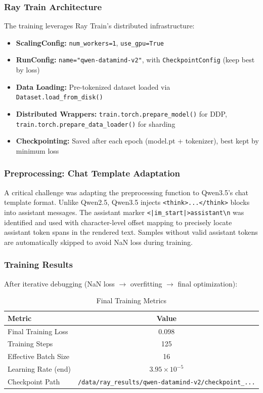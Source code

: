 \documentclass[12pt,a4paper]{article}
\begin{document}
\subsubsection{Ray Train Architecture}

The training leverages Ray Train's distributed infrastructure:

\begin{itemize}[leftmargin=*]
    \item \textbf{ScalingConfig:} \texttt{num\_workers=1}, \texttt{use\_gpu=True}
    \item \textbf{RunConfig:} \texttt{name="qwen-datamind-v2"}, with \texttt{CheckpointConfig} (keep best by loss)
    \item \textbf{Data Loading:} Pre-tokenized dataset loaded via \texttt{Dataset.load\_from\_disk()}
    \item \textbf{Distributed Wrappers:} \texttt{train.torch.prepare\_model()} for DDP, \texttt{train.torch.prepare\_data\_loader()} for sharding
    \item \textbf{Checkpointing:} Saved after each epoch (model.pt + tokenizer), best kept by minimum loss
\end{itemize}

\subsubsection{Preprocessing: Chat Template Adaptation}

A critical challenge was adapting the preprocessing function to Qwen3.5's chat template format. Unlike Qwen2.5, Qwen3.5 injects \texttt{<think>...</think>} blocks into assistant messages. The assistant marker \texttt{<|im\_start|>assistant\textbackslash n} was identified and used with character-level offset mapping to precisely locate assistant token spans in the rendered text. Samples without valid assistant tokens are automatically skipped to avoid NaN loss during training.

\subsubsection{Training Results}

After iterative debugging (NaN loss $\rightarrow$ overfitting $\rightarrow$ final optimization):

\begin{table}[H]
\centering
\caption{Final Training Metrics}
\begin{tabular}{lc}
\toprule
\textbf{Metric} & \textbf{Value} \\
\midrule
Final Training Loss & 0.098 \\
Training Steps & 125 \\
Effective Batch Size & 16 \\
Learning Rate (end) & $3.95\times10^{-5}$ \\
Checkpoint Path & \texttt{/data/ray\_results/qwen-datamind-v2/checkpoint\_...} \\
\bottomrule
\end{tabular}
\end{table}
\end{document}
